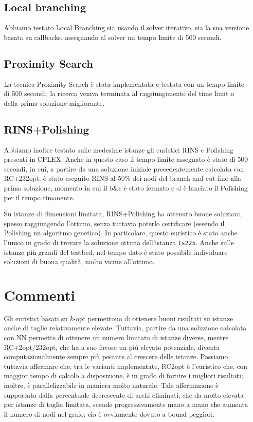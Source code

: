 \subsection{Local branching}
Abbiamo testato Local Branching sia usando il solver iterativo, sia la sua versione basata su callbacks, assegnando al solver un tempo limite di 500 secondi.

\subsection{Proximity Search}
La tecnica Proximity Search è stata implementata e testata con un tempo limite di 500 secondi; la ricerca veniva terminata al raggiungimento del time limit o della prima soluzione migliorante.

\subsection{RINS+Polishing}
Abbiamo inoltre testato sulle medesime istanze gli euristici RINS e Polishing presenti in CPLEX. Anche in questo caso il tempo limite assegnato è stato di 500 secondi, in cui, a partire da una soluzione iniziale precedentemente calcolata con RC+232opt, è stato eseguito RINS al 50\% dei nodi del branch-and-cut fino alla prima soluzione, momento in cui il b\&c è stato fermato e si è lanciato il Polishing per il tempo rimanente.

Su istanze di dimensioni limitata, RINS+Polishing ha ottenuto buone soluzioni, spesso raggiungendo l’ottimo, senza tuttavia poterlo certificare (essendo il Polishing un algoritmo genetico). In particolare, questo euristico è stato anche l’unico in grado di trovare la soluzione ottima dell’istanza \texttt{ts225}. Anche sulle istanze più grandi del testbed, nel tempo dato è stato possibile individuare soluzioni di buona qualità, molto vicine all’ottimo.

\section{Commenti}
Gli euristici basati su $k$-opt permettono di ottenere buoni risultati su istanze anche di taglie relativamente elevate. Tuttavia, partire da una soluzione calcolata con NN permette di ottenere un numero limitato di istanze diverse, mentre RC+2opt/232opt, che ha a suo favore un più elevato potenziale, diventa computazionalmente sempre più pesante al crescere delle istanze. Possiamo tuttavia affermare che, tra le varianti implementate, RC2opt è l’euristico che, con maggior tempo di calcolo a disposizione, è in grado di fornire i migliori risultati; inoltre, è parallelizzabile in maniera molto naturale. Tale affermazione è supportata dalla percentuale decrescente di archi eliminati, che da molto elevata per istanze di taglia limitata, scende progressivamente mano a mano che aumenta il numero di nodi nel grafo: cio è ovviamente dovuto a bound peggiori.

